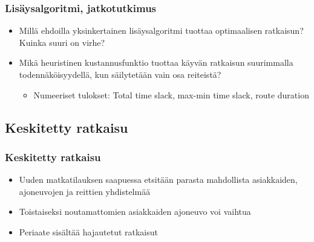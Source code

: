 \documentclass{beamer}
\begin{document}
    
    
    
        \begin{frame}
\frametitle{Lisäysalgoritmi, jatkotutkimus}
 \begin{itemize}
\item
Millä ehdoilla yksinkertainen lisäysalgoritmi tuottaa optimaalisen ratkaisun? Kuinka suuri on virhe?
\item
Mikä heuristinen kustannusfunktio tuottaa käyvän ratkaisun suurimmalla todennäköisyydellä, kun säilytetään vain osa reiteistä?
\begin{itemize}
 \item 
 Numeeriset tulokset: Total time slack, max-min time slack, route duration
\end{itemize}
\end{itemize}

\end{frame}
    
    
    
    
    
\subsection{Keskitetty ratkaisu}
\begin{frame}
  \frametitle{Keskitetty ratkaisu}   %
\begin{itemize}
\item
Uuden matkatilauksen saapuessa etsitään parasta mahdollista asiakkaiden, ajoneuvojen ja reittien yhdistelmää
\item
Toistaiseksi noutamattomien asiakkaiden ajoneuvo voi vaihtua
\item
Periaate sisältää hajautetut ratkaisut
\end{itemize}
\end{frame}
\end{document}
